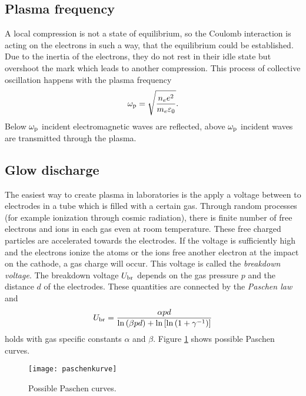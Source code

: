 \subsection{Plasma frequency}\label{subsec:plasmafreq}

A local compression is not a state of equilibrium, so the Coulomb interaction is acting on the electrons in such a way, that the equilibrium could be established. Due to the inertia of the electrons, they do not rest in their idle state but overshoot the mark which leads to another compression. This process of collective oscillation happens with the plasma frequency
\begin{align}
	\label{eq:plasmafreq}
	\omega_{\text{\scriptsize p}} = \sqrt{\frac{n_e e^2}{m_e \varepsilon_0}} \scriptsize{.}
\end{align}
Below $\omega_{\text{\scriptsize p}}$ incident electromagnetic waves are reflected, above $\omega_{\text{\scriptsize p}}$ incident waves are transmitted through the plasma.

\subsection{Glow discharge}\label{subsec:glowdischarge}

The easiest way to create plasma in laboratories is the apply a voltage between to electrodes in a tube which is filled with a certain gas. Through random processes (for example ionization through cosmic radiation), there is finite number of free electrons and ions in each gas even at room temperature. These free charged particles are accelerated towards the electrodes. If the voltage is sufficiently high and the electrons ionize the atoms or the ions free another electron at the impact on the cathode, a gas charge will occur. This voltage is called the \emph{breakdown voltage}. The breakdown voltage $U_{\text{\scriptsize br}}$ depends on the gas pressure $p$ and the distance $d$ of the electrodes. These quantities are connected by the \emph{Paschen law} and
\begin{align}
	\label{eq:paschen}
	U_{\text{\scriptsize br}} = \frac{\alpha p d}{\ln \left( \beta p d \right) + \ln \left[\ln \left( 1+\gamma^{-1} \right)\right]}
\end{align}
holds with gas specific constants $\alpha$ and $\beta$. Figure \ref{fig:paschen} shows possible Paschen curves.
\begin{figure}
	\centering
	\texttt{[image: paschenkurve]}
	\caption{\label{fig:paschen}Possible Paschen curves.}
\end{figure}

